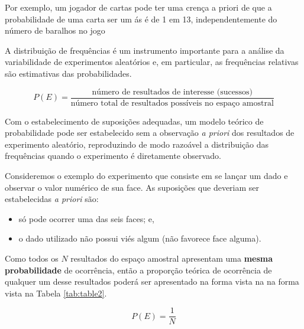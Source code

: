 \documentclass[
]{book}
\providecommand{\tightlist}{%
  \setlength{\itemsep}{0pt}\setlength{\parskip}{0pt}}
\begin{document}
\hfill\break

Por exemplo, um jogador de cartas pode ter uma crença a priori de que a probabilidade de uma carta ser um ás é de 1 em 13, independentemente do número de baralhos no jogo

\hfill\break

A distribuição de frequências é um instrumento importante para a análise da variabilidade de experimentos aleatórios e, em particular, as frequências relativas são estimativas das probabilidades.

\hfill\break

\[
P(E)= \frac{\text{número de resultados de interesse (sucessos)}}{\text{número total de resultados possíveis no espaço amostral}}
\]

\hfill\break

Com o estabelecimento de suposições adequadas, um modelo teórico de probabilidade pode ser estabelecido sem a observação \emph{a priori} dos resultados de experimento aleatório, reproduzindo de modo razoável a distribuição das frequências quando o experimento é diretamente observado.

\hfill\break

Consideremos o exemplo do experimento que consiste em se lançar um dado e observar o valor numérico de sua face. As suposições que deveriam ser estabelecidas \emph{a priori} são:

\hfill\break

\begin{itemize}
\tightlist
\item
  só pode ocorrer uma das seis faces; e,
\item
  o dado utilizado não possui viés algum (não favorece face alguma).
\end{itemize}

\hfill\break

Como todos os \(N\) resultados do espaço amostral apresentam uma \textbf{mesma probabilidade} de ocorrência, então a proporção teórica de ocorrência de qualquer um desse resultados poderá ser apresentado na forma vista na na forma vista na Tabela \ref{tab:table2}.

\hfill\break

\[
P(E)= \frac{1}{N}
\]

\hfill\break
\end{document}
